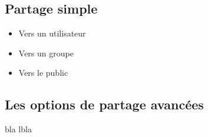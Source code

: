 \subsection*{Partage simple}

\begin{itemize}
    \item Vers un utilisateur
    \item Vers un groupe
    \item Vers le public 
\end{itemize}

\subsection*{Les options de partage avancées}

bla lbla